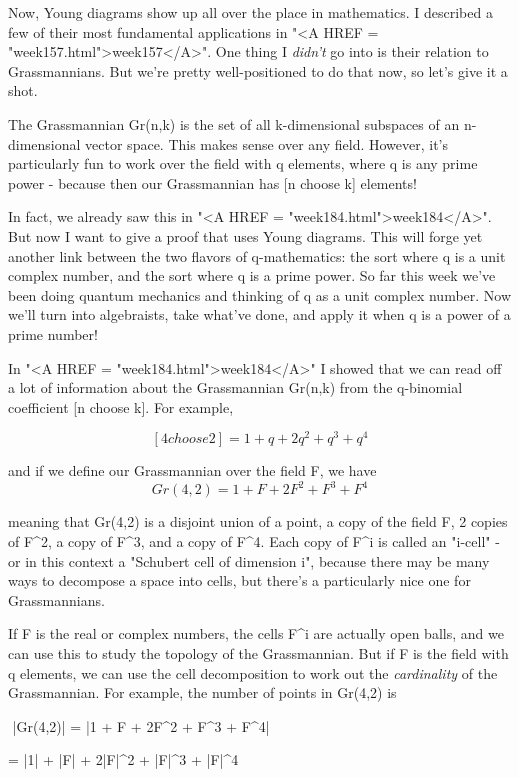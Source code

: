 Now, Young diagrams show up all over the place in mathematics.  I
described a few of their most fundamental applications in "<A HREF
= "week157.html">week157</A>".  One thing I \emph{didn't} go into is
their relation to Grassmannians.  But we're pretty well-positioned to do
that now, so let's give it a shot.

The Grassmannian Gr(n,k) is the set of all k-dimensional subspaces 
of an n-dimensional vector space.  This makes sense over any field.
However, it's particularly fun to work over the field with q elements, 
where q is any prime power - because then our Grassmannian has [n choose k] 
elements!  

In fact, we already saw this in "<A HREF =
"week184.html">week184</A>".  But now I want to give a proof that
uses Young diagrams.  This will forge yet another link between the two
flavors of q-mathematics: the sort where q is a unit complex number, and
the sort where q is a prime power.  So far this week we've been doing
quantum mechanics and thinking of q as a unit complex number.  Now we'll
turn into algebraists, take what've done, and apply it when q is a power
of a prime number!

In "<A HREF = "week184.html">week184</A>" I showed that we can
read off a lot of information about the Grassmannian Gr(n,k) from the
q-binomial coefficient [n choose k].  For example,

$$
[4 choose 2] = 1 + q + 2q^{2} + q^{3} + q^{4}
$$
    
and if we define our Grassmannian over the field F, we have
$$
     Gr(4,2) = 1 + F + 2F^{2} + F^{3} + F^{4}

$$
    
meaning that Gr(4,2) is a disjoint union of a point, a copy of the field
F, 2 copies of F^{2}, a copy of F^{3}, and a copy of
F^{4}.  Each copy of F^{i} is called an
"i-cell" - or in this context a "Schubert cell of
dimension i", because there may be many ways to decompose a space
into cells, but there's a particularly nice one for Grassmannians.

If F is the real or complex numbers, the cells F^{i} are actually open
balls, and we can use this to study the topology of the Grassmannian. 
But if F is the field with q elements, we can use the cell decomposition
to work out the \emph{cardinality} of the Grassmannian.  For example, the
number of points in Gr(4,2) is

$$
|Gr(4,2)| = |1  +  F  + 2F^{2}   +  F^{3} +   F^{4}|

          = |1| + |F| + 2|F|^{2} + |F|^{3} + |F|^{4}

